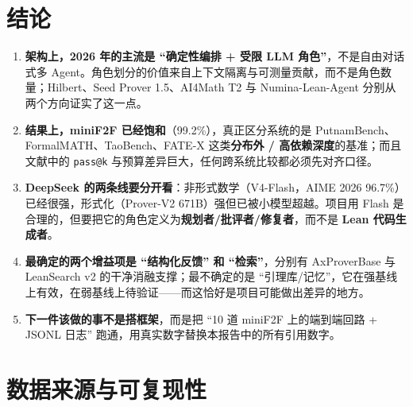 \documentclass[UTF8,a4paper,11pt,fontset=windows]{ctexart}
\newcommand{\code}[1]{\texttt{#1}}
\begin{document}
\section{结论}

\begin{enumerate}
  \item \textbf{架构上，2026 年的主流是 ``确定性编排 + 受限 LLM 角色''}，不是自由对话式多 Agent。角色划分的价值来自上下文隔离与可测量贡献，而不是角色数量；Hilbert、Seed Prover 1.5、AI4Math T2 与 Numina-Lean-Agent 分别从两个方向证实了这一点。
  \item \textbf{结果上，miniF2F 已经饱和}（99.2\%），真正区分系统的是 PutnamBench、FormalMATH、TaoBench、FATE-X 这类\textbf{分布外 / 高依赖深度}的基准；而且文献中的 \code{pass@k} 与预算差异巨大，任何跨系统比较都必须先对齐口径。
  \item \textbf{DeepSeek 的两条线要分开看}：非形式数学（V4-Flash，AIME 2026 96.7\%）已经很强，形式化（Prover-V2 671B）强但已被小模型超越。项目用 Flash 是合理的，但要把它的角色定义为\textbf{规划者/批评者/修复者}，而不是 \textbf{Lean 代码生成者}。
  \item \textbf{最确定的两个增益项是 ``结构化反馈'' 和 ``检索''}，分别有 AxProverBase 与 LeanSearch v2 的干净消融支撑；最不确定的是 ``引理库/记忆''，它在强基线上有效，在弱基线上待验证——而这恰好是项目可能做出差异的地方。
  \item \textbf{下一件该做的事不是搭框架}，而是把 ``10 道 miniF2F 上的端到端回路 + JSONL 日志'' 跑通，用真实数字替换本报告中的所有引用数字。
\end{enumerate}

\appendix

\section{数据来源与可复现性}
\end{document}

